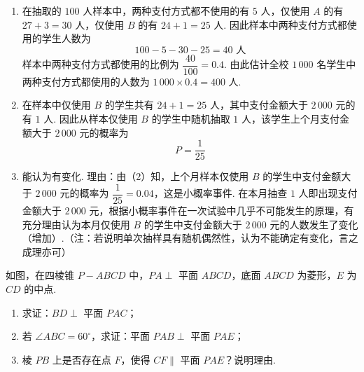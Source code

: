 \begin{solution}
\begin{enumerate}
\item 在抽取的 \(100\) 人样本中，两种支付方式都不使用的有 \(5\) 人，仅使用 \(A\) 的有 \(27+3=30\) 人，仅使用 \(B\) 的有 \(24+1=25\) 人. 因此样本中两种支付方式都使用的学生人数为
\[
100-5-30-25=40\text{ 人}
\]
样本中两种支付方式都使用的比例为 \(\dfrac{40}{100}=0.4\). 由此估计全校 \(1\,000\) 名学生中两种支付方式都使用的人数为 \(1\,000\times0.4=400\) 人.

\item 在样本中仅使用 \(B\) 的学生共有 \(24+1=25\) 人，其中支付金额大于 \(2\,000\) 元的有 \(1\) 人.
因此从样本仅使用 \(B\) 的学生中随机抽取 \(1\) 人，该学生上个月支付金额大于 \(2\,000\) 元的概率为
\[
P=\frac{1}{25}
\]

\item 能认为有变化. 理由：由（2）知，上个月样本仅使用 \(B\) 的学生中支付金额大于 \(2\,000\) 元的概率为 \(\dfrac{1}{25}=0.04\)，这是小概率事件. 在本月抽查 \(1\) 人即出现支付金额大于 \(2\,000\) 元，根据小概率事件在一次试验中几乎不可能发生的原理，有充分理由认为本月仅使用 \(B\) 的学生中支付金额大于 \(2\,000\) 元的人数发生了变化（增加）.（注：若说明单次抽样具有随机偶然性，认为不能确定有变化，言之成理亦可）
\end{enumerate}
\end{solution}

\begin{problem}
如图，在四棱锥 \(P-ABCD\) 中，\(PA\perp\) 平面 \(ABCD\)，底面 \(ABCD\) 为菱形，\(E\) 为 \(CD\) 的中点.

\begin{enumerate}
\item 求证：\(BD\perp\) 平面 \(PAC\)；

\item 若 \(\angle ABC=60^\circ\)，求证：平面 \(PAB\perp\) 平面 \(PAE\)；

\item 棱 \(PB\) 上是否存在点 \(F\)，使得 \(CF\parallel\) 平面 \(PAE\)？说明理由.
\end{enumerate}

\end{problem}

